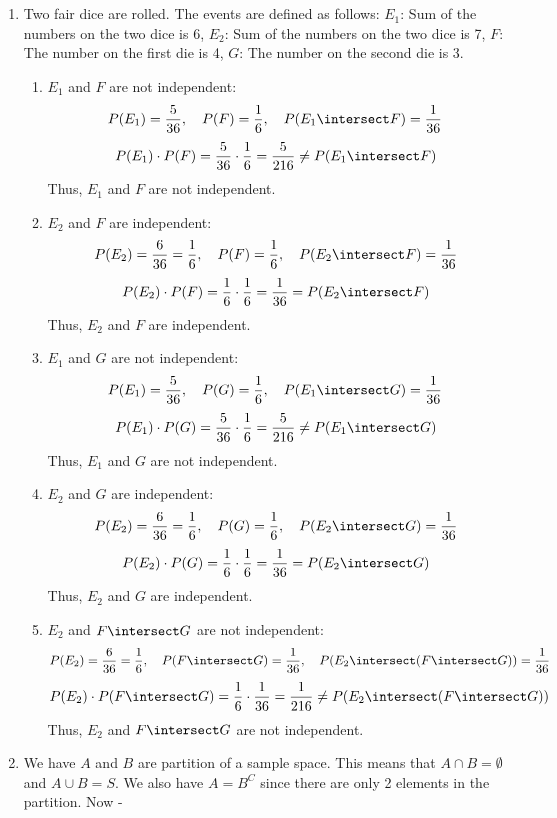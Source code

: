 \chapter{}
\begin{enumerate}
    \item Two fair dice are rolled. The events are defined as follows:
    $E_1$: Sum of the numbers on the two dice is 6, $E_2$: Sum of the numbers on the two dice is 7, $F$: The number on the first die is 4, $G$: The number on the second die is 3.
    \begin{enumerate}
        \item $E_1$ and $F$ are not independent:
        \[P(E_1) = \frac{5}{36}, \quad P(F) = \frac{1}{6}, \quad P(E_1 \intersect F) = \frac{1}{36}\]
        \[P(E_1) \cdot P(F) = \frac{5}{36} \cdot \frac{1}{6} = \frac{5}{216} \neq P(E_1 \intersect F)\]
        Thus, $E_1$ and $F$ are not independent.
        \item $E_2$ and $F$ are independent:
        \[P(E_2) = \frac{6}{36} = \frac{1}{6}, \quad P(F) = \frac{1}{6}, \quad P(E_2 \intersect F) = \frac{1}{36}\]
        \[P(E_2) \cdot P(F) = \frac{1}{6} \cdot \frac{1}{6} = \frac{1}{36} = P(E_2 \intersect F)\]
        Thus, $E_2$ and $F$ are independent.
        \item $E_1$ and $G$ are not independent:
        \[P(E_1) = \frac{5}{36}, \quad P(G) = \frac{1}{6}, \quad P(E_1 \intersect G) = \frac{1}{36}\]
        \[P(E_1) \cdot P(G) = \frac{5}{36} \cdot \frac{1}{6} = \frac{5}{216} \neq P(E_1 \intersect G)\]
        Thus, $E_1$ and $G$ are not independent.
        \item $E_2$ and $G$ are independent:
        \[P(E_2) = \frac{6}{36} = \frac{1}{6}, \quad P(G) = \frac{1}{6}, \quad P(E_2 \intersect G) = \frac{1}{36}\]
        \[P(E_2) \cdot P(G) = \frac{1}{6} \cdot \frac{1}{6} = \frac{1}{36} = P(E_2 \intersect G)\]
        Thus, $E_2$ and $G$ are independent.
        \item $E_2$ and $F\intersect G$ are not independent:
        \[P(E_2) = \frac{6}{36} = \frac{1}{6}, \quad P(F \intersect G) = \frac{1}{36}, \quad P(E_2 \intersect (F \intersect G)) = \frac{1}{36}\]
        \[P(E_2) \cdot P(F \intersect G) = \frac{1}{6} \cdot \frac{1}{36} = \frac{1}{216} \neq P(E_2 \intersect (F \intersect G))\]
        Thus, $E_2$ and $F\intersect G$ are not independent.
        \end{enumerate}
        \item We have $A$ and $B$ are partition of a sample space. This means that $A\cap B=\emptyset$ and $A\cup B=S$. We also have $A = B^C$ since there are only 2 elements in the partition. Now - 

\end{enumerate}
